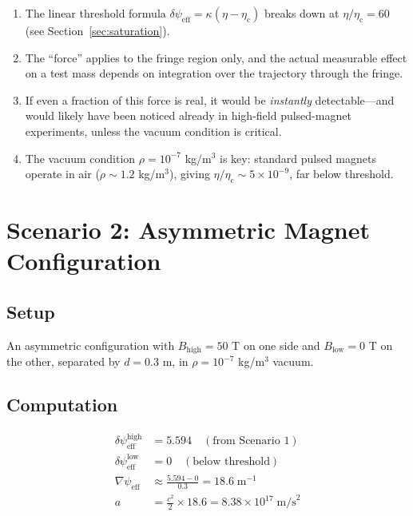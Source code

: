 \documentclass[12pt,a4paper]{article}
\newcommand{\psieff}{\psi_{\mathrm{eff}}}
\newcommand{\etac}{\eta_{\mathrm{c}}}
\begin{document}
\begin{enumerate}
\item The linear threshold formula $\delta\psieff = \kappa(\eta - \etac)$ breaks down at
      $\eta/\etac = 60$ (see Section~\ref{sec:saturation}).
\item The ``force'' applies to the fringe region only, and the actual measurable effect on a
      test mass depends on integration over the trajectory through the fringe.
\item If even a fraction of this force is real, it would be \emph{instantly} detectable---and
      would likely have been noticed already in high-field pulsed-magnet experiments, unless
      the vacuum condition is critical.
\item The vacuum condition $\rho = 10^{-7}$ kg/m$^3$ is key: standard pulsed magnets operate
      in air ($\rho \sim 1.2$ kg/m$^3$), giving $\eta/\etac \sim 5 \times 10^{-9}$, far below
      threshold.
\end{enumerate}

\section{Scenario 2: Asymmetric Magnet Configuration}
\label{sec:scenario2}

\subsection{Setup}

An asymmetric configuration with $B_{\text{high}} = 50$ T on one side and $B_{\text{low}} = 0$ T on
the other, separated by $d = 0.3$ m, in $\rho = 10^{-7}$ kg/m$^3$ vacuum.

\subsection{Computation}

\begin{align}
\delta\psieff^{\text{high}} &= 5.594 \quad (\text{from Scenario 1}) \\
\delta\psieff^{\text{low}} &= 0 \quad (\text{below threshold}) \\
\nabla\psieff &\approx \frac{5.594 - 0}{0.3} = 18.6 \;\text{m}^{-1} \\
a &= \frac{c^2}{2} \times 18.6 = 8.38 \times 10^{17} \;\text{m/s}^2
\end{align}
\end{document}

